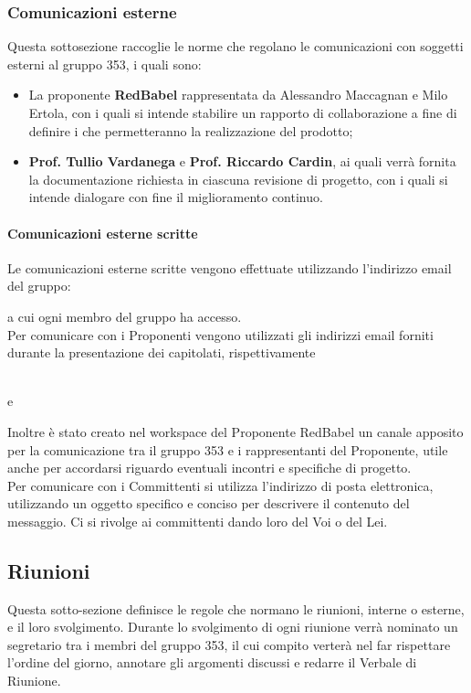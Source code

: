 \documentclass[NormeDiProgetto.tex]{subfiles}
\begin{document}
	\subsubsection{Comunicazioni esterne}
	Questa sottosezione raccoglie le norme che regolano le comunicazioni con soggetti esterni al gruppo 353, i quali sono:
	\begin{itemize}
		\item La proponente \textbf{RedBabel} rappresentata da Alessandro Maccagnan e Milo Ertola, con i quali si intende stabilire un rapporto di collaborazione a fine di definire i  che permetteranno la realizzazione del prodotto;
		\item \textbf{Prof. Tullio Vardanega} e \textbf{Prof. Riccardo Cardin}, ai quali verrà fornita la documentazione richiesta in ciascuna revisione di progetto, con i quali si intende dialogare con fine il miglioramento continuo.
	\end{itemize}
	\paragraph{Comunicazioni esterne scritte}
	Le comunicazioni esterne scritte vengono effettuate utilizzando l'indirizzo email del gruppo:
	\begin{center}
		\mailleaf
	\end{center}
	a cui ogni membro del gruppo ha accesso.\\
	Per comunicare con i Proponenti vengono utilizzati gli indirizzi email forniti durante la presentazione dei capitolati, rispettivamente 
	\begin{center}
		 \\
		e\\
		
	\end{center}
	Inoltre è stato creato nel workspace  del Proponente RedBabel un canale apposito per la comunicazione tra il gruppo 353 e i rappresentanti del Proponente, utile anche per accordarsi riguardo eventuali incontri e specifiche di progetto.\\
	Per comunicare con i Committenti si utilizza l'indirizzo di posta elettronica, utilizzando un oggetto specifico e conciso per descrivere il contenuto del messaggio. Ci si rivolge ai committenti dando loro del Voi o del Lei.
	
	\subsection{Riunioni}
	Questa sotto-sezione definisce le regole che normano le riunioni, interne o esterne, e il loro svolgimento. Durante lo svolgimento di ogni riunione verrà nominato un segretario tra i membri del gruppo 353, il cui compito verterà nel far rispettare l'ordine del giorno, annotare gli argomenti discussi e redarre il Verbale di Riunione.
\end{document}

